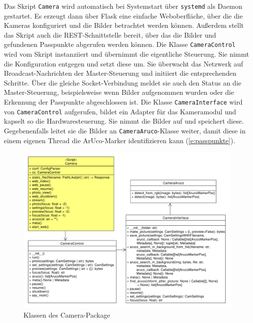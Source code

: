 \documentclass[./00PhotoBox.tex]{subfiles}
\begin{document}
Das Skript \texttt{Camera} wird au\-to\-ma\-tisch bei Systemstart über \texttt{systemd} als Daemon gestartet. Es erzeugt dann über Flask eine einfache Weboberfläche, über die die Kameras konfiguriert und die Bilder betrachtet werden können. Außerdem stellt das Skript auch die \Gls{REST}-Schnittstelle bereit, über das die Bilder und gefundenen Passpunkte abgerufen werden können. Die Klasse \texttt{CameraControl} wird vom Skript instanziiert und übernimmt die eigentliche Steuerung. Sie nimmt die Konfiguration entgegen und setzt diese um. Sie überwacht das Netzwerk auf Broadcast-Nachrichten der Master-Steuerung und initiiert die entsprechenden Schritte.  Über die gleiche \Gls{Socket}-Verbindung meldet sie auch den Status an die Master-Steuerung, beispielsweise wenn Bilder aufgenommen wurden oder die Erkennung der Passpunkte abgeschlossen ist. Die Klasse \texttt{CameraInterface} wird von \texttt{CameraControl} aufgerufen, bildet ein Adapter für das Kameramodul und kapselt so die Hardwaresteuerung. Sie nimmt die Bilder auf und speichert diese. Gegebenenfalls leitet sie die Bilder an \texttt{CameraAruco}-Klasse weiter, damit diese in einem eigenen Thread die ArUco-Marker identifizieren kann (\autoref{e:passpunkte}).

\begin{figure}
    \centering
    \includegraphics[width=1\textwidth]{./img/uml/uml_camera_classdiagramm.pdf}
    \caption{Klassen des Camera-Package}
    \label{img:uml_camera}
\end{figure}
\end{document}
